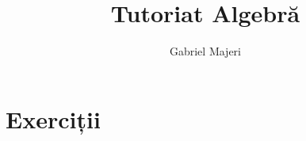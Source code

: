 \documentclass[a4paper, 12pt]{article}
\title{Tutoriat Algebră}
\author{Gabriel Majeri}
\date{}
\theoremstyle{definition}
\begin{document}
\maketitle

\section*{Exerciții}













\end{document}
